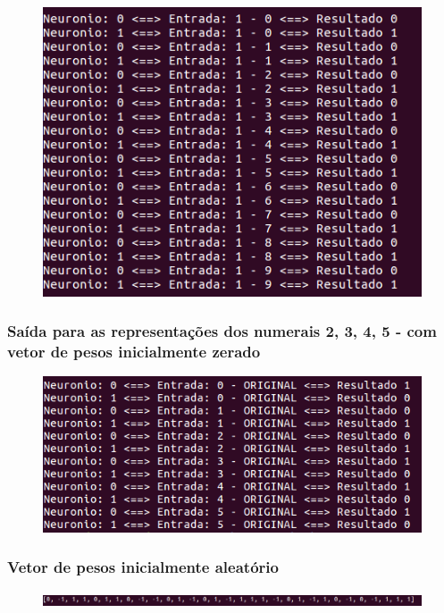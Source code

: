 \documentclass[hidelinks,12pt]{article}
\begin{document}
		\begin{figure}[!h]
			\centering
			\includegraphics[scale=0.7]{Figures/E2S1.png}
		\end{figure}
		
		\newpage
		
		\subsubsection{Saída para as representações dos numerais 2, 3, 4, 5 - com vetor de pesos inicialmente zerado}
		
		\begin{figure}[!h]
			\centering
			\includegraphics[scale=0.7]{Figures/E2SALL.png}
		\end{figure}
		
		\newpage
		\subsubsection{Vetor de pesos inicialmente aleatório}
			
		\begin{figure}[!h]
			\centering
			\includegraphics[scale=0.5]{Figures/E2PI0.png}
		\end{figure}
		
\end{document}
